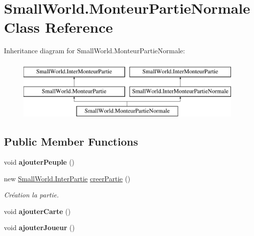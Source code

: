 \hypertarget{class_small_world_1_1_monteur_partie_normale}{\section{Small\-World.\-Monteur\-Partie\-Normale Class Reference}
\label{class_small_world_1_1_monteur_partie_normale}
}
Inheritance diagram for Small\-World.\-Monteur\-Partie\-Normale\-:\begin{figure}[H]
\begin{center}
\leavevmode
\includegraphics[height=3.000000cm]{class_small_world_1_1_monteur_partie_normale}
\end{center}
\end{figure}
\subsection*{Public Member Functions}
\begin{DoxyCompactItemize}
\item 
\hypertarget{class_small_world_1_1_monteur_partie_normale_a095529a4b08f7227415e960e7edf4be4}{void {\bfseries ajouter\-Peuple} ()}\label{class_small_world_1_1_monteur_partie_normale_a095529a4b08f7227415e960e7edf4be4}

\item 
\hypertarget{class_small_world_1_1_monteur_partie_normale_af9df898cf843a8838c5d6a1ecf3de320}{new \hyperlink{interface_small_world_1_1_inter_partie}{Small\-World.\-Inter\-Partie} \hyperlink{class_small_world_1_1_monteur_partie_normale_af9df898cf843a8838c5d6a1ecf3de320}{creer\-Partie} ()}\label{class_small_world_1_1_monteur_partie_normale_af9df898cf843a8838c5d6a1ecf3de320}

\begin{DoxyCompactList}\small\item\em Création la partie. \end{DoxyCompactList}\item 
\hypertarget{class_small_world_1_1_monteur_partie_normale_a9f6a6e1e348fa3d971ee8a409e986c55}{void {\bfseries ajouter\-Carte} ()}\label{class_small_world_1_1_monteur_partie_normale_a9f6a6e1e348fa3d971ee8a409e986c55}

\item 
\hypertarget{class_small_world_1_1_monteur_partie_normale_a6ba30a3502a862c7943ba991eacc2fb0}{void {\bfseries ajouter\-Joueur} ()}\label{class_small_world_1_1_monteur_partie_normale_a6ba30a3502a862c7943ba991eacc2fb0}

\end{DoxyCompactItemize}

